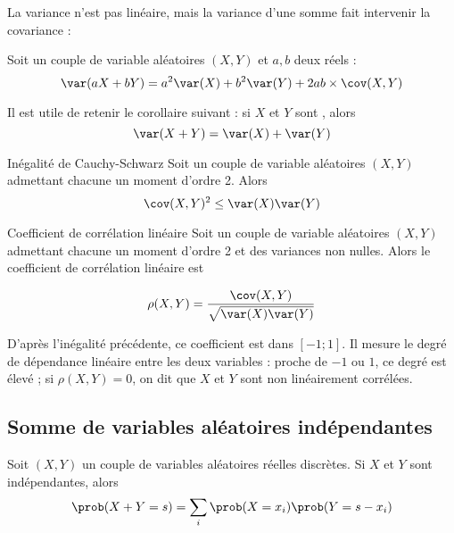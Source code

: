 La variance n'est pas linéaire, mais la variance d'une somme fait intervenir la covariance :

\begin{proposition}{}{}
	Soit un couple de variable aléatoires $(X,Y)$ et $a,b$ deux réels :
	$$\var(aX+bY)=a^2\var(X)+b^2\var(Y)+2ab \times \cov(X,Y)$$
\end{proposition}

Il est utile de retenir le corollaire suivant : si $X$ et $Y$ sont , alors $$\var(X+Y)=\var(X)+\var(Y)$$

\begin{proposition}{Inégalité de Cauchy-Schwarz}{}
	Soit un couple de variable aléatoires $(X,Y)$ admettant chacune un moment d'ordre 2. Alors 
$$\cov(X,Y)^2 \leq \var(X)\var(Y)$$	

\end{proposition}

\begin{definition}{Coefficient de corrélation linéaire}{}
	Soit un couple de variable aléatoires $(X,Y)$ admettant chacune un moment d'ordre 2 et des variances non nulles. Alors le coefficient de corrélation linéaire est 
	
	$$\rho(X,Y)=\frac{\cov(X,Y)}{\sqrt{\var(X)\var(Y)}}$$
\end{definition}

D'après l'inégalité précédente, ce coefficient est dans $[-1;1]$. Il mesure le degré de dépendance linéaire entre les deux variables : proche de $-1$ ou $1$, ce degré est élevé ; si $\rho(X,Y)=0$, on dit que $X$ et $Y$ sont non linéairement corrélées.


					
%					


		
\subsection{Somme de variables aléatoires indépendantes}

\begin{proposition}{}{}
	Soit  $(X,Y)$ un couple de variables aléatoires réelles discrètes. Si $X$ et $Y$ sont indépendantes, alors $$ \prob(X+Y=s) = \sum_i \prob(X=x_i) \prob(Y=s-x_i)$$
\end{proposition}

